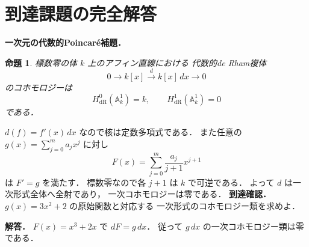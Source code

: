 \documentclass[a5paper,10pt,onecolumn]{jsarticle}
\makeatletter
\theoremstyle{mathnotetheorem}
\newtheorem{proposition}[theorem]{命題}
\renewcommand{\proofname}{証明}
\renewenvironment{proof}[1][\proofname]{%
  \par\pushQED{\qed}\normalfont\topsep4\p@\@plus2\p@\relax
  \trivlist\item[\hskip\labelsep\bfseries #1]\ignorespaces
}{\popQED\endtrivlist\@endpefalse}
\makeatother
\begin{document}
\section{到達課題の完全解答}
\noindent\textbf{一次元の代数的Poincaré補題．}
\begin{proposition}
標数零の体 $k$ 上のアフィン直線における
代数的de Rham複体
\[
0\longrightarrow k[x]
\xrightarrow{d}k[x]\,dx\longrightarrow0
\]
のコホモロジーは
\[
H^0_{\mathrm{dR}}(\mathbb A^1_k)=k,\qquad
H^1_{\mathrm{dR}}(\mathbb A^1_k)=0
\]
である．
\end{proposition}
\begin{proof}
$d(f)=f'(x)\,dx$ なので核は定数多項式である．
また任意の $g(x)=\sum_{j=0}^ma_jx^j$ に対し
\[
F(x)=\sum_{j=0}^m\frac{a_j}{j+1}x^{j+1}
\]
は $F'=g$ を満たす．
標数零なので各 $j+1$ は $k$ で可逆である．
よって $d$ は一次形式全体へ全射であり，
一次コホモロジーは零である．
\end{proof}
\noindent\textbf{到達確認．}
$g(x)=3x^2+2$ の原始関数と対応する
一次形式のコホモロジー類を求めよ．
\par\noindent\textbf{解答．}
$F(x)=x^3+2x$ で $dF=g\,dx$．
従って $g\,dx$ の一次コホモロジー類は零である．
\end{document}
